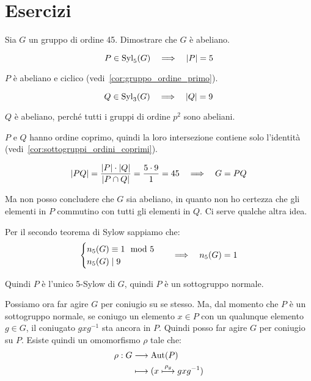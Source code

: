\chapter{Esercizi}
\label{ch:esercizi_settimana_4}

\begin{esercizio}
    Sia $G$ un gruppo di ordine 45.
    Dimostrare che $G$ è abeliano.
\end{esercizio}
\begin{soluzione}
    \begin{equation*}
        P \in \operatorname{Syl}_5(G) \quad\Longrightarrow\quad \lvert P \rvert = 5
    \end{equation*}

    $P$ è abeliano e ciclico (vedi~\ref{cor:gruppo_ordine_primo}).

    \begin{equation*}
        Q \in \operatorname{Syl}_3(G) \quad\Longrightarrow\quad \lvert Q \rvert = 9
    \end{equation*}

    $Q$ è abeliano, perché tutti i gruppi di ordine $p^2$ sono abeliani.

    $P$ e $Q$ hanno ordine coprimo, quindi la loro intersezione contiene solo l'identità
    (vedi~\ref{cor:sottogruppi_ordini_coprimi}).

    \begin{equation*}
        \lvert PQ \rvert = \dfrac{\lvert P \rvert \cdot \lvert Q \rvert}{\lvert P \cap Q \rvert} = \dfrac{5 \cdot 9}{1} = 45 \quad\Longrightarrow\quad G = PQ
    \end{equation*}

    Ma non posso concludere che $G$ sia abeliano, in quanto non ho certezza che gli elementi in $P$ commutino con tutti
    gli elementi in $Q$.
    Ci serve qualche altra idea.

    Per il secondo teorema di Sylow sappiamo che:
    \begin{gather*}
        \begin{cases}
            n_5(G) \equiv 1 \mod 5 \\
            n_5(G) \mid 9
        \end{cases}
        \quad\Longrightarrow\quad n_5(G) = 1
    \end{gather*}

    Quindi $P$ è l'unico 5-Sylow di $G$, quindi $P$ è un sottogruppo normale.

    Possiamo ora far agire $G$ per coniugio su se stesso.
    Ma, dal momento che $P$ è un sottogruppo normale, se coniugo un elemento $x \in P$ con un qualunque elemento $g \in G$,
    il coniugato $g x g^{-1}$ sta ancora in $P$.
    Quindi posso far agire $G$ per coniugio su $P$.
    Esiste quindi un omomorfismo $\rho$ tale che:
    \begin{align*}
        \rho: G &\longrightarrow \operatorname{Aut}(P) \\
         &\longmapsto (x \overset{\rho_g}{\longmapsto} gxg^{-1})
    \end{align*}


\end{soluzione}
